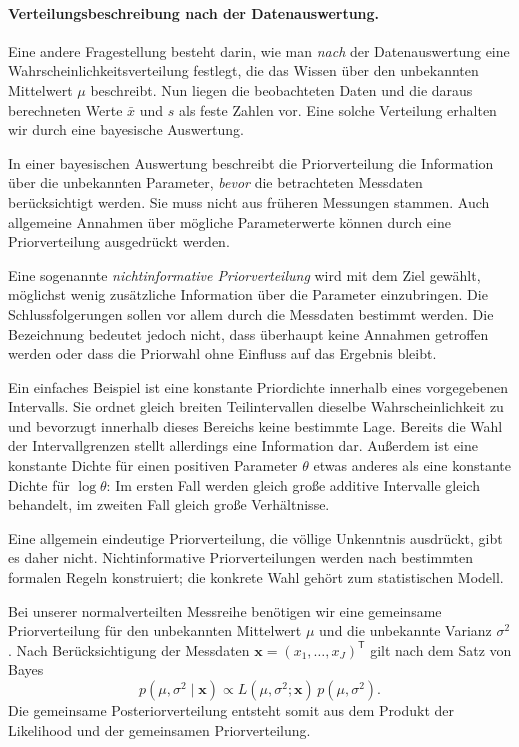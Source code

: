 \paragraph{Verteilungsbeschreibung nach der Datenauswertung.}

Eine andere Fragestellung besteht \mbox{darin}, wie man
\emph{nach} der Datenauswertung eine Wahrscheinlichkeitsverteilung
festlegt, die das Wissen über den unbekannten Mittelwert $\mu$
beschreibt. Nun liegen die beobachteten Daten und die daraus
berechneten Werte $\bar x$ und $s$ als feste Zahlen vor.
Eine solche Verteilung erhalten wir durch eine bayesische Auswertung.

In einer bayesischen Auswertung beschreibt die Priorverteilung
die Information über die unbekannten Parameter, \emph{bevor}
die betrachteten Messdaten berücksichtigt werden.
Sie muss nicht aus früheren Messungen stammen.
Auch allgemeine Annahmen über mögliche Parameterwerte können
durch eine Priorverteilung ausgedrückt werden.

Eine sogenannte \textsl{nichtinformative Priorverteilung}
wird mit dem Ziel gewählt, möglichst wenig zusätzliche Information
über die Parameter einzubringen. Die Schlussfolgerungen sollen
vor allem durch die Messdaten bestimmt werden.
Die Bezeichnung bedeutet jedoch nicht, dass überhaupt keine
Annahmen getroffen werden oder dass die Priorwahl ohne Einfluss
auf das Ergebnis bleibt.

Ein einfaches Beispiel ist eine konstante Priordichte innerhalb
eines vorgegebenen Intervalls. Sie ordnet gleich breiten
Teilintervallen dieselbe Wahrscheinlichkeit zu und bevorzugt
innerhalb dieses Bereichs keine bestimmte Lage.
Bereits die Wahl der Intervallgrenzen stellt allerdings
eine Information dar. Außerdem ist eine konstante Dichte
für einen positiven Parameter $\theta$ etwas anderes als
eine konstante Dichte für $\log\theta$: Im ersten Fall werden
gleich große additive Intervalle gleich behandelt, im zweiten
Fall gleich große Verhältnisse.

Eine allgemein eindeutige Priorverteilung, die völlige Unkenntnis
ausdrückt, gibt es daher nicht. Nichtinformative Priorverteilungen
werden nach bestimmten formalen Regeln konstruiert;
die konkrete Wahl gehört zum statistischen Modell.

Bei unserer normalverteilten Messreihe benötigen wir eine
gemeinsame Priorverteilung für den unbekannten Mittelwert $\mu$
und die unbekannte Varianz $\sigma^2$.
Nach Berücksichtigung der Messdaten
$\mathbf x=(x_1,\dots,x_J)^\mathsf T$ gilt nach dem Satz von Bayes
\begin{equation}
p(\mu,\sigma^2\mid\mathbf x)
\propto
L(\mu,\sigma^2;\mathbf x)\,p(\mu,\sigma^2).
\end{equation}
Die gemeinsame Posteriorverteilung entsteht somit aus dem Produkt
der Likelihood und der gemeinsamen Priorverteilung.

